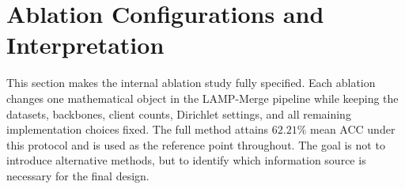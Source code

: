 \documentclass[letterpaper]{article}
\theoremstyle{definition}
\theoremstyle{plain}
\begin{document}
\begin{table}[!t]
\centering
\caption{Class-wise statistics and representative samples for ChaoShengMNIST. The private ultrasound subset retains anonymized class identifiers, which are reported without assigning unverified clinical names.}
\label{tab:appendix-ultrasound-classes}
\scriptsize
\renewcommand{\arraystretch}{1.25}
\setlength{\tabcolsep}{3.8pt}
\end{table}

\section{Ablation Configurations and Interpretation}
\label{app:ablation-configurations}

This section makes the internal ablation study fully specified. Each ablation changes one mathematical object in the LAMP-Merge pipeline while keeping the datasets, backbones, client counts, Dirichlet settings, and all remaining implementation choices fixed. The full method attains \(62.21\%\) mean ACC under this protocol and is used as the reference point throughout. The goal is not to introduce alternative methods, but to identify which information source is necessary for the final design.
\end{document}
